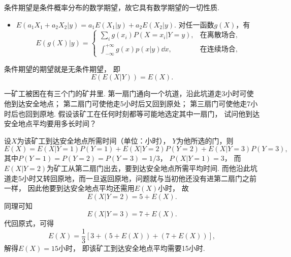 条件期望是条件概率分布的数学期望，故它具有数学期望的一切性质.
\begin{itemize}
	\item \(E(a_1 X_1 + a_2 X_2 \vert y)
	= a_1 E(X_1 \vert y) + a_2 E(X_2 \vert y)\).
	对任一函数\(g(X)\)，有\[
		E(g(X) \vert y)
		= \left\{ \begin{array}{cl}
			\sum_i g(x_i) P(X=x_i \vert Y = y),
			& \text{在离散场合}, \\
			\int_{-\infty}^{+\infty} g(x) p(x \vert y) \dd{x},
			& \text{在连续场合},
		\end{array} \right.
	\]
\end{itemize}

\begin{theorem}\label{theorem:条件期望.条件期望与期望的关系}
条件期望的期望就是无条件期望，
即\begin{equation}
	E(E(X \vert Y)) = E(X).
\end{equation}
\end{theorem}

\begin{example}
一矿工被困在有三个门的矿井里.
第一扇门通向一个坑道，沿此坑道走3小时可使他到达安全地点；
第二扇门可使他走5小时后又回到原处；
第三扇门可使他走7小时后也回到原地.
假设该矿工在任何时刻都等可能地选定其中一扇门，
试问他到达安全地点平均要用多长时间？
\begin{solution}
设\(X\)为该矿工到达安全地点所需时间（单位：小时），
\(Y\)为他所选的门，则\begin{equation*}
	E(X)
	= E(X \vert Y=1) P(Y=1)
	+ E(X \vert Y=2) P(Y=2)
	+ E(X \vert Y=3) P(Y=3),
\end{equation*}
其中\(P(Y=1) = P(Y=2) = P(Y=3) = 1/3\)，
\(P(X \vert Y=1) = 3\)，
而\(E(X \vert Y=2)\)为矿工从第二扇门出去，要到达安全地点所需平均时间.
而他沿此坑道走5小时又转回原地，而一旦返回原地，问题就与当初他还没有进第二扇门之前一样，
因此他要到达安全地点平均还需用\(E(X)\)小时，
故\[
	E(X \vert Y=2)
	= 5 + E(X).
\]
同理可知\[
	E(X \vert Y=3)
	= 7 + E(X).
\]
代回原式，可得\[
	E(X) = \frac13[ 3 + (5 + E(X)) + (7 + E(X)) ],
\]
解得\(E(X) = 15\)小时，
即该矿工到达安全地点平均需要15小时.
\end{solution}
\end{example}
